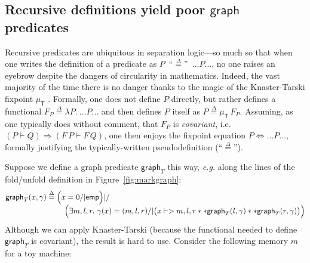\documentclass[acmsmall,review,anonymous]{acmart}\settopmatter{printfolios=true,printccs=false,printacmref=false}
\newcommand{\defeq}{\mathbin{\stackrel{\Delta}{=}}}
\newcommand{\p}[1]{\ensuremath{\mathsf{#1}}} \newcommand{\m}[1]{\ensuremath{\mathit{#1}}} \newcommand{\ma}[1]{\ensuremath{\mathcal{#1}}} \let\ramify\lightning
\begin{document}
\subsection{Recursive definitions yield poor \p{graph} predicates}\label{sec:fixpointfail}

\newcommand{\graphkt}{\p{graph}_T}
\newcommand{\grapham}{\p{graph}_A}


Recursive predicates are ubiquitous in separation logic---so
much so that when one writes the definition of a predicate as
\mbox{$P$ ``$\defeq$'' $\ldots P \! \ldots$}, no one raises an eyebrow despite the
dangers of circularity in mathematics. Indeed, the vast majority of the time there
is no danger thanks to the magic of the Knaster-Tarski fixpoint
$\mu_{\mathsf{T}}$ \cite{tarski:fixpoint}.  Formally, one does not define $P$ directly,
but rather defines a functional
\mbox{$F_P \defeq \lambda P.~ \ldots P \! \ldots$} and then defines $P$ itself as
\mbox{$P \defeq \mu_{\mathsf{T}} \, F_P$}.
Assuming, as one typically does without comment,
that $F_P$ is \emph{covariant}, i.e. $(P \vdash Q)
\Rightarrow (F \, P \vdash F \, Q)$, one then enjoys the fixpoint
equation $P \Leftrightarrow \ldots P \ldots$, formally justifying
the typically-written pseudodefinition (``$\defeq$'').



Suppose we define a graph predicate $\graphkt$ this way, \emph{e.g.} along the lines of the fold/unfold definition in Figure~\ref{fig:markgraph}: \vspace{-1ex}
\[
\begin{array}{@{}l@{}l@{}}
\graphkt(x, \gamma) \stackrel{\Delta}{=} \; &\Big(x = 0 /| \p{emp}\Big) |/ \\
&\quad \Big(\exists m,l,r.~ \gamma(x)=(m,l,r) /|
\big(x |-> m,l,r ** \graphkt(l, \gamma) ** \graphkt(r, \gamma)\big)\Big)
\end{array}
\vspace{-1ex}
\]
Although we can apply Knaster-Tarski (because the functional needed to
define $\graphkt$ is covariant), the result is hard to use.
Consider the following memory $m$ for a toy machine:
\end{document}
